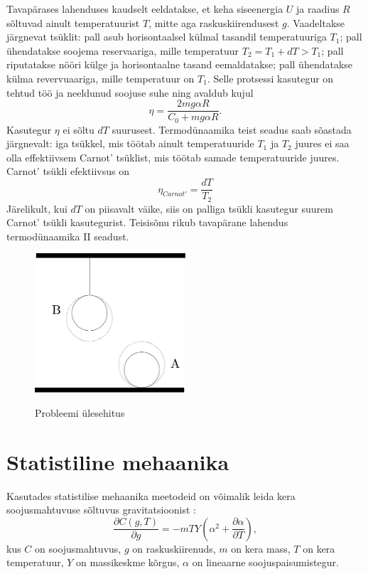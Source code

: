 \documentclass{trkut}%
\begin{document}
Tavapärases lahenduses kaudselt eeldatakse, et keha siseenergia \(U\) ja raadius \(R\) sõltuvad ainult temperatuurist \(T\), mitte aga raskuskiirendusest \(g\). Vaadeltakse järgnevat tsüklit: pall asub horisontaalsel külmal tasandil temperatuuriga \(T_1\); pall ühendatakse soojema reservaariga, mille temperatuur \(T_2=T_1+dT>T_1\); pall riputatakse nööri külge ja horisontaalne tasand eemaldatakse; pall ühendatakse külma revervuaariga, mille temperatuur on \(T_1\). Selle protsessi kasutegur on tehtud töö ja neeldunud soojuse suhe ning avaldub kujul \cite{palma15}
\begin{equation}
    \eta = \frac{2mg\alpha R}{C_0+mg\alpha R}.
\end{equation}
Kasutegur \(\eta\) ei sõltu \(dT\) suurusest. Termodünaamika teist seadus saab sõastada järgnevalt: iga tsükkel, mis töötab ainult temperatuuride \(T_1\) ja \(T_2\) juures ei saa olla effektiivsem Carnot' tsüklist, mis töötab samade temperatuuride juures. Carnot' tsükli efektiivsus on 
\begin{equation}
    \eta_{Carnot'} = \frac{dT}{T_2}
\end{equation}
Järelikult, kui \(dT\) on piisavalt väike, siis on palliga tsükli kasutegur suurem Carnot' tsükli kasutegurist. Teisisõnu rikub tavapärane lahendus termodünaamika II seadust.
\begin{figure}[h]
    \includegraphics[width=0.5\textwidth]{joonis1.pdf}
    \caption{Probleemi ülesehitus}
    \cite{palma15}
    \allikas{}
    \label{iphojoonis}%
\end{figure}

\section{Statistiline mehaanika}

Kasutades statistilise mehaanika meetodeid on võimalik leida kera soojusmahtuvuse sõltuvus gravitatsioonist \cite{palma15}:
\begin{equation}
    \frac{\partial C(g,T)}{\partial g} = -mTY \left( \alpha^2 + \frac{\partial \alpha}{\partial T} \right),
\end{equation}
kus \(C\) on soojusmahtuvus, \(g\) on raskuskiirenuds, \(m\) on kera mass, \(T\) on kera temperatuur, \(Y\) on massikeskme kõrgus, \(\alpha\) on lineaarne soojuspaisumistegur. 
\end{document}
